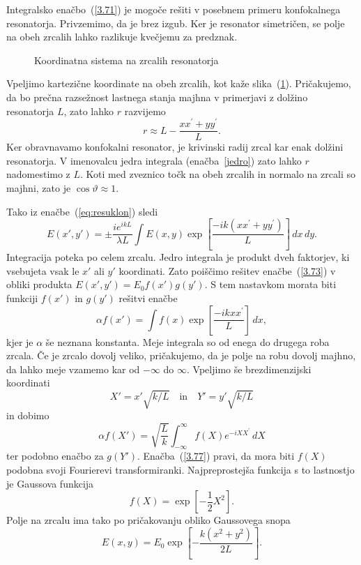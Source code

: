 Integralsko enačbo~(\ref{3.71}) je mogoče rešiti v posebnem primeru
konfokalnega resonatorja. Privzemimo, da je brez izgub. 
Ker je resonator simetričen, se polje na obeh zrcalih lahko razlikuje kvečjemu
za predznak.
\begin{figure}[h]
\centering
\def\svgwidth{110truemm} 

\caption{Koordinatna sistema na zrcalih resonatorja}
\label{fig:uklon_res_shema}
\end{figure}
Vpeljimo kartezične koordinate na obeh zrcalih, kot kaže slika~(\ref{fig:uklon_res_shema}).
Pričakujemo, da bo prečna razsežnost lastnega stanja majhna v primerjavi
z dolžino resonatorja $L$, zato lahko $r$ razvijemo 
\begin{equation}
r\approx L-\frac{xx^{\prime}+yy^{\prime}}{L}.
\label{3.72}
\end{equation}
Ker obravnavamo konfokalni resonator, je krivinski radij zrcal kar enak dolžini resonatorja.
V imenovalcu jedra integrala (enačba~\ref{jedro}) zato lahko $r$ nadomestimo
z $L$. Koti med zveznico točk na obeh zrcalih in normalo na zrcali
so majhni, zato je  $\cos\vartheta \approx 1$. 

Tako iz enačbe~(\ref{eq:resuklon})
sledi
\begin{equation}
E(x',y')=\pm\frac{ie^{ikL}}{\lambda L}\int E(x,y)\exp
\left[\frac{-ik(xx^{\prime}+yy^{\prime})}{L}\right]\, dx\, dy.
\label{3.73}
\end{equation}
Integracija poteka po celem zrcalu. Jedro integrala je produkt dveh
faktorjev, ki vsebujeta vsak le $x'$ ali $y'$ koordinati. Zato poiščimo
rešitev enačbe~(\ref{3.73}) v obliki produkta 
$
E(x',y')=E_{0}f(x')g(y').
$
S tem nastavkom morata biti funkciji $f(x')$ in $g(y')$ rešitvi enačbe
\begin{equation}
\alpha f(x')=\int f(x)\exp\left[\frac{-ikxx^{\prime}}{L}\right]\, dx,
\label{3.75}
\end{equation}
kjer je $\alpha$ še neznana konstanta. Meje integrala so od enega do 
drugega roba zrcala. Če je zrcalo dovolj veliko,
pričakujemo, da je polje na robu dovolj majhno, da lahko meje vzamemo
kar od $-\infty$ do $\infty$. Vpeljimo še brezdimenzijski koordinati
\begin{equation}
X'=x'\sqrt{k/L} \quad \mathrm{in} \quad Y'=y'\sqrt{k/L}
\label{3.76}
\end{equation}
in dobimo
\begin{equation}
\alpha f(X')=\sqrt{\frac{L}{k}}\int_{-\infty}^{\infty}f(X)e^{-iXX^{\prime}}\, dX
\label{3.77}
\end{equation}
ter podobno enačbo za $g(Y')$. Enačba~(\ref{3.77}) pravi, da mora
biti $f(X)$ podobna svoji Fourierevi transformiranki. Najpreprostejša
funkcija s to lastnostjo je Gaussova funkcija 
\begin{equation}
f(X)=\exp[-\frac{1}{2}X^{2}].
\label{3.78}
\end{equation}
Polje na zrcalu ima tako po pričakovanju obliko Gaussovega snopa
\begin{equation}
E(x,y)=E_{0}\exp\left[-\frac{k(x^{2}+y^{2})}{2L}\right].
\label{3.79}
\end{equation}

